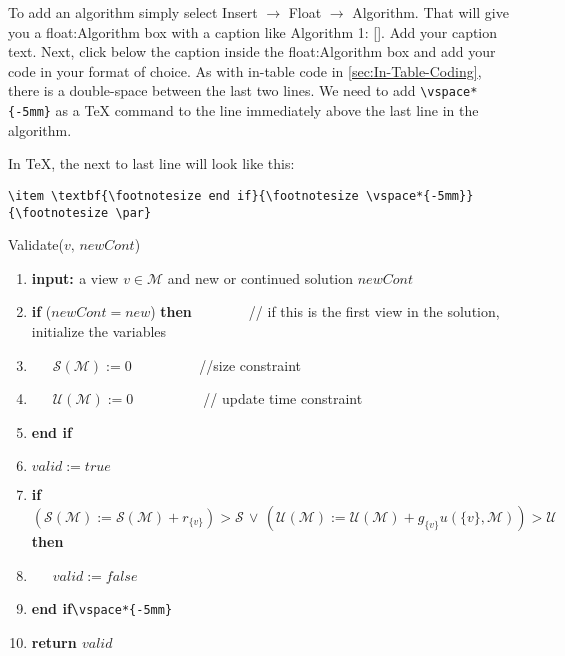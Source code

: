 
 \label{sec:Algorithms}

To add an algorithm simply select Insert $\rightarrow$ Float $\rightarrow$
Algorithm. That will give you a float:Algorithm box with a caption
like Algorithm 1: {[}{]}. Add your caption text. Next, click below
the caption inside the float:Algorithm box and add your code in your
format of choice. As with in-table code in \ref{sec:In-Table-Coding},
there is a double-space between the last two lines. We need to add
\texttt{\textbackslash{}vspace{*}\{-5mm\}} as a \TeX{} command to
the line immediately above the last line in the algorithm.

In \TeX{}, the next to last line will look like this:

\noindent \texttt{\textbackslash{}item \textbackslash{}textbf\{\textbackslash{}footnotesize
end if\}\{\textbackslash{}footnotesize \textbackslash{}vspace{*}\{-5mm\}\}\{\textbackslash{}footnotesize
\textbackslash{}par\}}

\begin{algorithm}
\caption{\label{alg:Validate()}Validate($v,\, newCont$)}

\begin{enumerate}
\item \textbf{\footnotesize{input: }}{\footnotesize{a view $v\in\mathcal{M}$
and new or continued solution $newCont$}}{\footnotesize \par}
\item \textbf{\footnotesize{if}}{\footnotesize{ ($newCont=new$) }}\textbf{\footnotesize{then~}}{\footnotesize{~~~~~~~//
if this is the first view in the solution, initialize the variables}}{\footnotesize \par}
\item {\footnotesize{~~~$\mathcal{S}(\mathcal{M}):=0$ ~~~~~~~~~//size
constraint}}{\footnotesize \par}
\item {\footnotesize{~~~$\mathcal{U}(\mathcal{M}):=0$~~~~~~~~~~//
update time constraint}}{\footnotesize \par}
\item \textbf{\footnotesize{end if}}{\footnotesize \par}
\item {\footnotesize{$valid:=true$}}{\footnotesize \par}
\item \textbf{\footnotesize{if}}{\footnotesize{ $(\mathcal{S}(\mathcal{M}):=\mathcal{S}(\mathcal{M})+r_{\{v\}})>\mathcal{S}\,\vee\,(\mathcal{U}(\mathcal{M}):=\mathcal{U}(\mathcal{M})+g_{\{v\}}u(\{v\},\mathcal{M}))>\mathcal{U}$
}}\textbf{\footnotesize{then }}{\footnotesize \par}
\item {\footnotesize{~~~$valid:=false$}}{\footnotesize \par}
\item \textbf{\footnotesize{end if}}{\footnotesize{\texttt{\textbackslash{}vspace{*}\{-5mm\}}}}{\footnotesize \par}
\item \textbf{\footnotesize{return $valid$}}\end{enumerate}
\end{algorithm}


